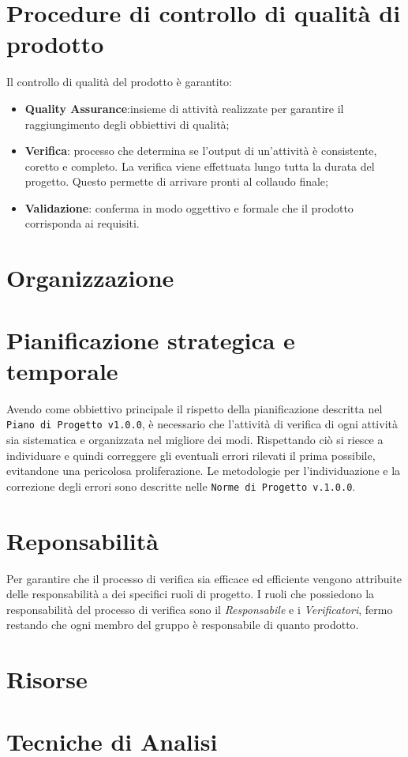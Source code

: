 \section{Procedure di controllo di qualità di prodotto}
Il controllo di qualità del prodotto è garantito: 
\begin{itemize}
	\item \textbf{Quality Assurance}:insieme di attività realizzate per garantire il raggiungimento degli obbiettivi di qualità;
	\item \textbf{Verifica}: processo che determina se l'output di un'attività è consistente, coretto e completo. La verifica viene effettuata lungo tutta la durata del progetto. Questo permette di arrivare pronti al collaudo finale;
	\item \textbf{Validazione}: conferma in modo oggettivo e formale che il prodotto corrisponda ai requisiti.
\end{itemize}
\section{Organizzazione}
\section{Pianificazione strategica e temporale}
Avendo come obbiettivo principale il rispetto della pianificazione descritta nel \texttt{Piano di Progetto v1.0.0}, è necessario che l'attività di verifica di ogni attività sia sistematica e organizzata nel migliore dei modi. 
Rispettando ciò si riesce a individuare e quindi correggere gli eventuali errori rilevati il prima possibile, evitandone una pericolosa proliferazione. 
Le metodologie per l'individuazione e la correzione degli errori sono descritte nelle \texttt{Norme di Progetto v.1.0.0}.
\section{Reponsabilità}
Per garantire che il processo di verifica sia efficace ed efficiente vengono attribuite delle responsabilità a dei specifici ruoli di progetto.
I ruoli che possiedono la responsabilità del processo di verifica sono il \textit{Responsabile} e i \textit{Verificatori}, fermo restando che ogni membro del gruppo è responsabile di quanto prodotto.
\section{Risorse}
\section{Tecniche di Analisi}